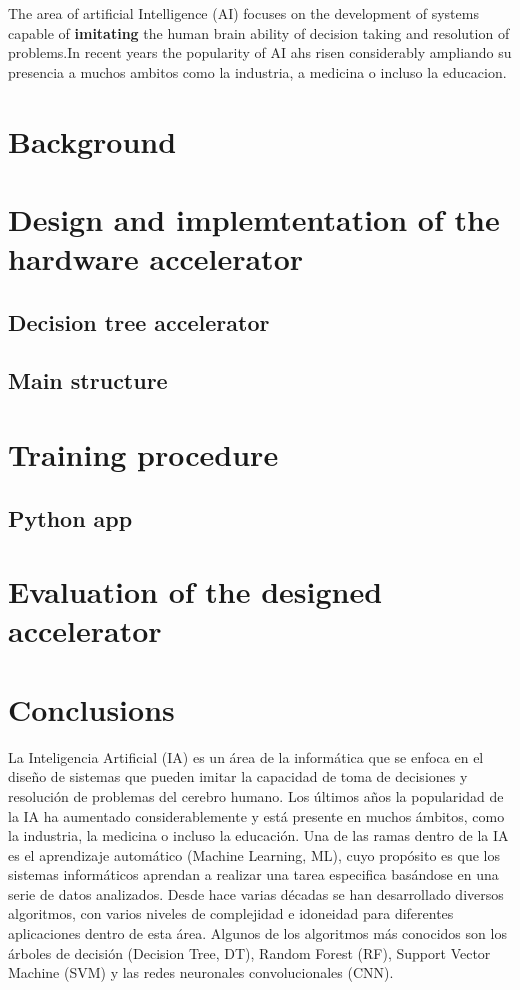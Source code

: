 \documentclass[conference, 10pt]{IEEEtran}
\begin{document}
The area of artificial Intelligence (AI) focuses on the development of systems capable of \textbf{imitating} the human brain ability of decision taking and resolution of problems.In recent years the popularity of AI ahs risen considerably ampliando su presencia a muchos ambitos como la industria, a medicina o incluso la educacion.      


\section{Background}
\section{Design and implemtentation of the hardware accelerator}
\subsection{Decision tree accelerator}
\subsection{Main structure}
\section{Training procedure}
\subsection{Python app}
\section{Evaluation of the designed accelerator}
\section{Conclusions}

La Inteligencia Artificial (IA) es un área de la informática que se enfoca en el diseño de sistemas que pueden imitar
la capacidad de toma de decisiones y resolución de problemas del cerebro humano. Los últimos años la popularidad
de la IA ha aumentado considerablemente y está presente en muchos ámbitos, como la industria, la medicina o
incluso la educación. Una de las ramas dentro de la IA es el aprendizaje automático (Machine Learning, ML), cuyo
propósito es que los sistemas informáticos aprendan a realizar una tarea especifica basándose en una serie de datos
analizados. Desde hace varias décadas se han desarrollado diversos algoritmos, con varios niveles de complejidad e
idoneidad para diferentes aplicaciones dentro de esta área. Algunos de los algoritmos más conocidos son los árboles
de decisión (Decision Tree, DT), Random Forest (RF), Support Vector Machine (SVM) y las redes neuronales
convolucionales (CNN).
\end{document}
